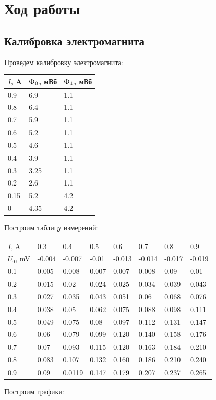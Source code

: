 \documentclass[a4paper,12pt]{article}
\begin{document}
		\section{Ход работы}
		\subsection{Калибровка электромагнита}
		Проведем калибровку электромагнита:
		\begin{center}
			\begin{tabular}{l|l|l}
				$I$, A    & $\Upphi_0$, мВб   & $\Upphi_1$, мВб   \\ \hline
				0.9  & 6.9  & 1.1 \\
				0.8  & 6.4  & 1.1 \\
				0.7  & 5.9  & 1.1 \\
				0.6  & 5.2  & 1.1 \\
				0.5  & 4.6  & 1.1 \\
				0.4  & 3.9  & 1.1 \\
				0.3  & 3.25 & 1.1 \\
				0.2  & 2.6  & 1.1 \\
				0.15 & 5.2  & 4.2 \\
				0    & 4.35 & 4.2 \\
			\end{tabular}
		\end{center}
		Построим таблицу измерений:
		\begin{center}
			    \begin{tabular}{l|lllllll}
			    	$I$, A    & 0.3    & 0.4    & 0.5   & 0.6    & 0.7    & 0.8    & 0.9    \\
			    	$U_0$, mV & -0.004 & -0.007 & -0.01 & -0.013 & -0.014 & -0.017 & -0.019 \\ \hline
			    	0.1  & 0.005  & 0.008  & 0.007 & 0.007  & 0.008  & 0.09   & 0.01   \\
			    	0.2  & 0.015  & 0.02   & 0.024 & 0.025  & 0.034  & 0.039  & 0.043  \\
			    	0.3  & 0.027  & 0.035  & 0.043 & 0.051  & 0.06   & 0.068  & 0.076  \\
			    	0.4  & 0.038  & 0.05   & 0.062 & 0.075  & 0.088  & 0.098  & 0.111  \\
			    	0.5  & 0.049  & 0.075  & 0.08  & 0.097  & 0.112  & 0.131  & 0.147  \\
			    	0.6  & 0.06   & 0.079  & 0.099 & 0.120  & 0.140  & 0.158  & 0.176  \\
			    	0.7  & 0.07   & 0.093  & 0.115 & 0.120  & 0.163  & 0.184  & 0.210  \\
			    	0.8  & 0.083  & 0.107  & 0.132 & 0.160  & 0.186  & 0.210  & 0.240  \\
			    	0.9  & 0.09   & 0.0119 & 0.147 & 0.179  & 0.207  & 0.237  & 0.265  \\
			    \end{tabular}
		\end{center}
		Построим графики:
		
\end{document}
